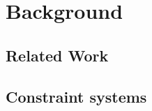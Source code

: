 
\chapter{Background}\label{chapter:Background}

  \section{Related Work}
  \section{Constraint systems}

  



